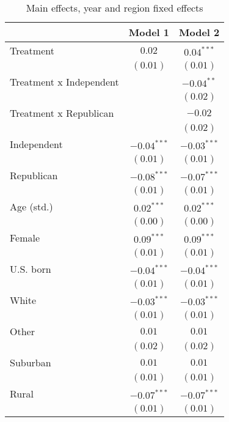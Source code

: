 
\begin{table}
\caption{Main effects, year and region fixed effects}
\begin{center}
\begin{tabular}{l c c}
\toprule
 & Model 1 & Model 2 \\
\midrule
Treatment               & $0.02$        & $0.04^{***}$  \\
                        & $(0.01)$      & $(0.01)$      \\
Treatment x Independent &               & $-0.04^{**}$  \\
                        &               & $(0.02)$      \\
Treatment x Republican  &               & $-0.02$       \\
                        &               & $(0.02)$      \\
Independent             & $-0.04^{***}$ & $-0.03^{***}$ \\
                        & $(0.01)$      & $(0.01)$      \\
Republican              & $-0.08^{***}$ & $-0.07^{***}$ \\
                        & $(0.01)$      & $(0.01)$      \\
Age (std.)              & $0.02^{***}$  & $0.02^{***}$  \\
                        & $(0.00)$      & $(0.00)$      \\
Female                  & $0.09^{***}$  & $0.09^{***}$  \\
                        & $(0.01)$      & $(0.01)$      \\
U.S. born               & $-0.04^{***}$ & $-0.04^{***}$ \\
                        & $(0.01)$      & $(0.01)$      \\
White                   & $-0.03^{***}$ & $-0.03^{***}$ \\
                        & $(0.01)$      & $(0.01)$      \\
Other                   & $0.01$        & $0.01$        \\
                        & $(0.02)$      & $(0.02)$      \\
Suburban                & $0.01$        & $0.01$        \\
                        & $(0.01)$      & $(0.01)$      \\
Rural                   & $-0.07^{***}$ & $-0.07^{***}$ \\
                        & $(0.01)$      & $(0.01)$      \\

\end{tabular}
\end{center}
\end{table}
